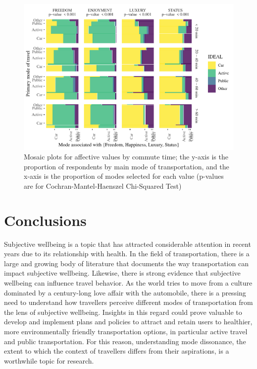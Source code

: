 \documentclass[]{elsarticle} %
\makeatletter
\def\maxwidth{\ifdim\Gin@nat@width>\linewidth\linewidth
\else\Gin@nat@width\fi}
\let\Oldincludegraphics\includegraphics
\renewcommand{\includegraphics}[1]{\Oldincludegraphics[width=\maxwidth]{#1}}
\makeatother
\begin{document}
\begin{figure}
\centering
\includegraphics{Dissonance_Santiago_v1_files/figure-latex/figure-mosaic-plots-by-attribute-and-time-1.pdf}
\caption{\label{fig:mosaic-plots-by-travel-time}Mosaic plots for
affective values by commute time; the y-axis is the proportion of
respondents by main mode of transportation, and the x-axis is the
proportion of modes selected for each value (p-values are for
Cochran-Mantel-Haenszel Chi-Squared Test)}
\end{figure}

\hypertarget{conclusions}{%
\section{Conclusions}\label{conclusions}}

Subjective wellbeing is a topic that has attracted considerable
attention in recent years due to its relationship with health. In the
field of transportation, there is a large and growing body of literature
that documents the way transportation can impact subjective wellbeing.
Likewise, there is strong evidence that subjective wellbeing can
influence travel behavior. As the world tries to move from a culture
dominated by a century-long love affair with the automobile, there is a
pressing need to understand how travellers perceive different modes of
transportation from the lens of subjective wellbeing. Insights in this
regard could prove valuable to develop and implement plans and policies
to attract and retain users to healthier, more environmentally friendly
transportation options, in particular active travel and public
transportation. For this reason, understanding mode dissonance, the
extent to which the context of travellers differs from their
aspirations, is a worthwhile topic for research.
\end{document}
